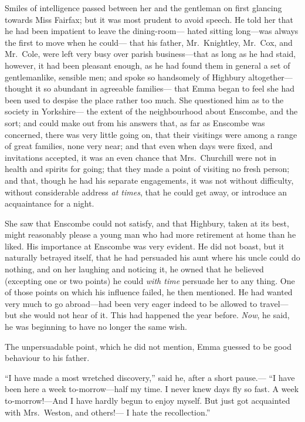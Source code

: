 Smiles of intelligence passed between her and the gentleman on first
glancing towards Miss Fairfax; but it was most prudent to avoid speech.
He told her that he had been impatient to leave the dining-room---%
hated sitting long---was always the first to move when he could---%
that his father, Mr.\ Knightley, Mr.\ Cox, and Mr.\ Cole, were left
very busy over parish business---that as long as he had staid,
however, it had been pleasant enough, as he had found them in general
a set of gentlemanlike, sensible men; and spoke so handsomely of
Highbury altogether---thought it so abundant in agreeable families---%
that Emma began to feel she had been used to despise the place
rather too much.  She questioned him as to the society in Yorkshire---%
the extent of the neighbourhood about Enscombe, and the sort;
and could make out from his answers that, as far as Enscombe
was concerned, there was very little going on, that their visitings
were among a range of great families, none very near; and that even
when days were fixed, and invitations accepted, it was an even
chance that Mrs.\ Churchill were not in health and spirits for going;
that they made a point of visiting no fresh person; and that,
though he had his separate engagements, it was not without difficulty,
without considerable address \emph{at times}, that he could get away,
or introduce an acquaintance for a night.

She saw that Enscombe could not satisfy, and that Highbury,
taken at its best, might reasonably please a young man who had more
retirement at home than he liked.  His importance at Enscombe was
very evident.  He did not boast, but it naturally betrayed itself,
that he had persuaded his aunt where his uncle could do nothing,
and on her laughing and noticing it, he owned that he believed (excepting
one or two points) he could \emph{with time} persuade her to any thing.
One of those points on which his influence failed, he then mentioned.
He had wanted very much to go abroad---had been very eager indeed
to be allowed to travel---but she would not hear of it.  This had
happened the year before.  \emph{Now}, he said, he was beginning to have
no longer the same wish.

The unpersuadable point, which he did not mention, Emma guessed
to be good behaviour to his father.

``I have made a most wretched discovery,'' said he, after a short pause.---%
``I have been here a week to-morrow---half my time.  I never knew
days fly so fast.  A week to-morrow!---And I have hardly begun to
enjoy myself.  But just got acquainted with Mrs.\ Weston, and others!---%
I hate the recollection.''

